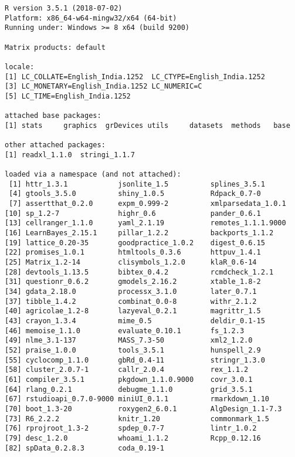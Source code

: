 \documentclass[]{article}
\begin{document}
\begin{verbatim}
R version 3.5.1 (2018-07-02)
Platform: x86_64-w64-mingw32/x64 (64-bit)
Running under: Windows >= 8 x64 (build 9200)

Matrix products: default

locale:
[1] LC_COLLATE=English_India.1252  LC_CTYPE=English_India.1252   
[3] LC_MONETARY=English_India.1252 LC_NUMERIC=C                  
[5] LC_TIME=English_India.1252    

attached base packages:
[1] stats     graphics  grDevices utils     datasets  methods   base     

other attached packages:
[1] readxl_1.1.0  stringi_1.1.7

loaded via a namespace (and not attached):
 [1] httr_1.3.1            jsonlite_1.5          splines_3.5.1        
 [4] gtools_3.5.0          shiny_1.0.5           Rdpack_0.7-0         
 [7] assertthat_0.2.0      expm_0.999-2          xmlparsedata_1.0.1   
[10] sp_1.2-7              highr_0.6             pander_0.6.1         
[13] cellranger_1.1.0      yaml_2.1.19           remotes_1.1.1.9000   
[16] LearnBayes_2.15.1     pillar_1.2.2          backports_1.1.2      
[19] lattice_0.20-35       goodpractice_1.0.2    digest_0.6.15        
[22] promises_1.0.1        htmltools_0.3.6       httpuv_1.4.1         
[25] Matrix_1.2-14         clisymbols_1.2.0      klaR_0.6-14          
[28] devtools_1.13.5       bibtex_0.4.2          rcmdcheck_1.2.1      
[31] questionr_0.6.2       gmodels_2.16.2        xtable_1.8-2         
[34] gdata_2.18.0          processx_3.1.0        later_0.7.1          
[37] tibble_1.4.2          combinat_0.0-8        withr_2.1.2          
[40] agricolae_1.2-8       lazyeval_0.2.1        magrittr_1.5         
[43] crayon_1.3.4          mime_0.5              deldir_0.1-15        
[46] memoise_1.1.0         evaluate_0.10.1       fs_1.2.3             
[49] nlme_3.1-137          MASS_7.3-50           xml2_1.2.0           
[52] praise_1.0.0          tools_3.5.1           hunspell_2.9         
[55] cyclocomp_1.1.0       gbRd_0.4-11           stringr_1.3.0        
[58] cluster_2.0.7-1       callr_2.0.4           rex_1.1.2            
[61] compiler_3.5.1        pkgdown_1.1.0.9000    covr_3.0.1           
[64] rlang_0.2.1           debugme_1.1.0         grid_3.5.1           
[67] rstudioapi_0.7.0-9000 miniUI_0.1.1          rmarkdown_1.10       
[70] boot_1.3-20           roxygen2_6.0.1        AlgDesign_1.1-7.3    
[73] R6_2.2.2              knitr_1.20            commonmark_1.5       
[76] rprojroot_1.3-2       spdep_0.7-7           lintr_1.0.2          
[79] desc_1.2.0            whoami_1.1.2          Rcpp_0.12.16         
[82] spData_0.2.8.3        coda_0.19-1          
\end{verbatim}
\end{document}
